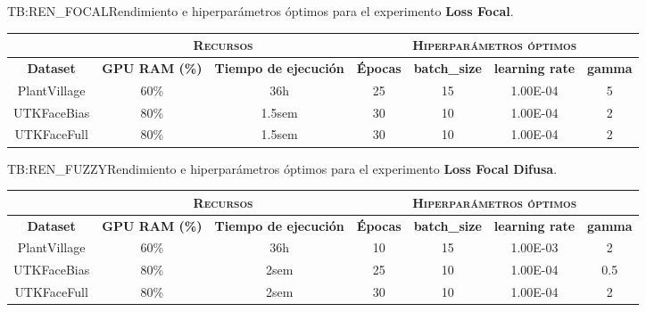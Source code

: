 \begin{table}[Rendimiento Loss Focal]{TB:REN_FOCAL}{Rendimiento e hiperparámetros óptimos para el experimento \textbf{Loss Focal}.}
    \small
    \begin{tabular}{|c|c|c|c|c|c|c|}
    \hline
         &  \multicolumn{2}{c|}{\textsc{Recursos}} & \multicolumn{4}{c|}{\textsc{Hiperparámetros óptimos}} \\ \hline
        \textbf{Dataset} & \textbf{GPU RAM (\%)} & \textbf{Tiempo de ejecución} & \textbf{Épocas} & \textbf{batch\_size} & \textbf{learning rate} & \textbf{gamma} \\ \hline
        PlantVillage & 60\% & 36h & 25 & 15 & 1.00E-04 & 5 \\ \hline
        UTKFaceBias & 80\% & 1.5sem & 30 & 10 & 1.00E-04 & 2 \\ \hline
        UTKFaceFull & 80\% & 1.5sem & 30 & 10 & 1.00E-04 & 2 \\ \hline
    \end{tabular}
\end{table}

\begin{table}[Rendimiento Loss Focal Difusa]{TB:REN_FUZZY}{Rendimiento e hiperparámetros óptimos para el experimento \textbf{Loss Focal Difusa}.}
    \small
    \begin{tabular}{|c|c|c|c|c|c|c|}
    \hline
         &  \multicolumn{2}{c|}{\textsc{Recursos}} & \multicolumn{4}{c|}{\textsc{Hiperparámetros óptimos}} \\ \hline
        \textbf{Dataset} & \textbf{GPU RAM (\%)} & \textbf{Tiempo de ejecución} & \textbf{Épocas} & \textbf{batch\_size} & \textbf{learning rate} & \textbf{gamma} \\ \hline
        PlantVillage & 60\% & 36h & 10 & 15 & 1.00E-03 & 2 \\ \hline
        UTKFaceBias & 80\% & 2sem & 25 & 10 & 1.00E-04 & 0.5 \\ \hline
        UTKFaceFull & 80\% & 2sem & 30 & 10 & 1.00E-04 & 2 \\ \hline
    \end{tabular}
\end{table}

